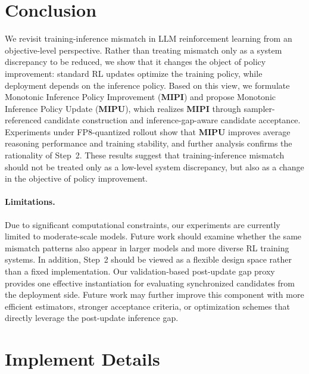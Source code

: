 \documentclass{article}
\begin{document}






\section{Conclusion}
\label{sec:conclusion}
We revisit training-inference mismatch in LLM reinforcement learning from an objective-level perspective. 
Rather than treating mismatch only as a system discrepancy to be reduced, we show that it changes the object of policy improvement: standard RL updates optimize the training policy, while deployment depends on the inference policy. 
Based on this view, we formulate Monotonic Inference Policy Improvement (\textbf{MIPI}) and propose Monotonic Inference Policy Update (\textbf{MIPU}), which realizes \textbf{MIPI} through sampler-referenced candidate construction and inference-gap-aware candidate acceptance. 
Experiments under FP8-quantized rollout show that \textbf{MIPU} improves average reasoning performance and training stability, and further analysis confirms the rationality of Step~2.
These results suggest that training-inference mismatch should not be treated only as a low-level system discrepancy, but also as a change in the objective of policy improvement.


\paragraph{Limitations.}
Due to significant computational constraints, our experiments are currently limited to moderate-scale models. 
Future work should examine whether the same mismatch patterns also appear in larger models and more diverse RL training systems.
In addition, Step~2 should be viewed as a flexible design space rather than a fixed implementation. 
Our validation-based post-update gap proxy provides one effective instantiation for evaluating synchronized candidates from the deployment side. 
Future work may further improve this component with more efficient estimators, stronger acceptance criteria, or optimization schemes that directly leverage the post-update inference gap.





\newpage
\appendix

\section{Implement Details}
\label{app:details}
\end{document}
